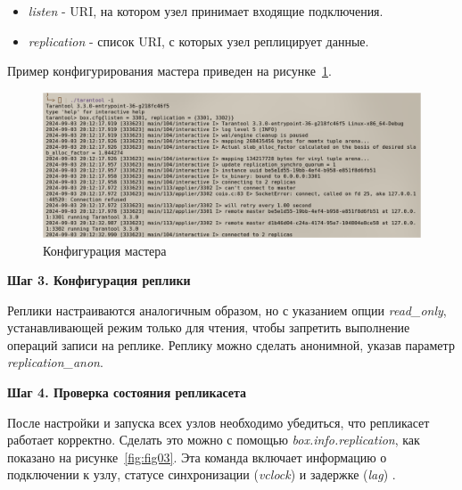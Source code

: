 \begin{itemize}
    \item \textit{listen} - URI, на котором узел принимает входящие подключения.
    \item \textit{replication} - список URI, с которых узел реплицирует данные.
\end{itemize}

Пример конфигурирования мастера приведен на рисунке~\ref{fig:fig01}.

\begin{figure}
  \centering
  \includegraphics[scale=0.35]{inc/master.png}
  \caption{Конфигурация мастера}
  \label{fig:fig01}
\end{figure}

\textbf{Шаг 3. Конфигурация реплики}

Реплики настраиваются аналогичным образом, но с указанием опции \textit{read\_only}, устанавливающей режим только для чтения, чтобы запретить выполнение операций записи на реплике. Реплику можно сделать анонимной, указав параметр \textit{replication\_anon}.

\textbf{Шаг 4. Проверка состояния репликасета}

После настройки и запуска всех узлов необходимо убедиться, что репликасет работает корректно. Сделать это можно с помощью \textit{box.info.replication}, как показано на рисунке~\ref{fig:fig03}. Эта команда включает информацию о подключении к узлу, статусе синхронизации (\textit{vclock}) и задержке (\textit{lag}) \cite{TarantoolDoc}.

